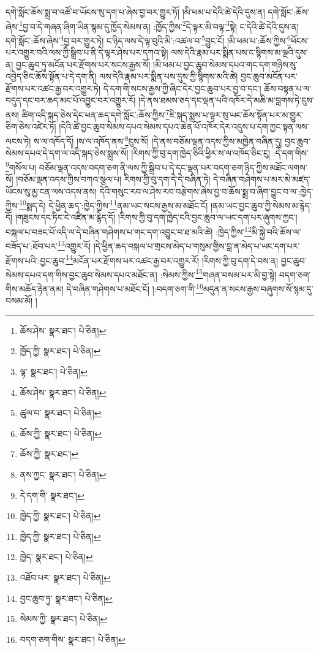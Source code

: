 དགེ་སློང་ཆོས་སྨྲ་བ་འཚོ་བ་ཡོངས་སུ་དག་པ་ཞེས་བྱ་བར་གྱུར་ཏོ། །མི་ཕམ་པ་དེའི་ཚེ་དེའི་དུས་ན། དགེ་སློང་:ཆོས་ཞེས་\footnote{ཆོས་ཤེས་  སྣར་ཐང་།  པེ་ཅིན། }བྱ་བ་དེ་གཞན་ཞིག་ཡིན་སྙམ་དུ་ཁྱོད་སེམས་ན། :ཁྱོད་ཀྱིས་\footnote{ཁྱོད་ཀྱི་  སྣར་ཐང་།  པེ་ཅིན། }དེ་ལྟར་མི་བལྟ་\footnote{ལྟ་  སྣར་ཐང་།  པེ་ཅིན། }སྟེ། ང་དེའི་ཚེ་དེའི་དུས་ན། དགེ་སློང་:ཆོས་ཞེས་\footnote{ཆོས་ཤེས་  སྣར་ཐང་།  པེ་ཅིན། }བྱ་བར་གྱུར་ཏེ། ང་ཉིད་ལས་དེ་ལྟ་བུའི་མི་:འཚལ་བ་\footnote{ཚུལ་བ་  སྣར་ཐང་།  པེ་ཅིན། }བྱུང་ངོ། །མི་ཕམ་པ་:ཆོས་ཀྱིས་\footnote{ཆོས་ཀྱི་  སྣར་ཐང་།  པེ་ཅིན། }ཕོངས་པར་འགྱུར་བའི་ལས་ཀྱི་སྒྲིབ་པ་ནི་དེ་ལྟར་ཤེས་པར་དཀའ་སྟེ། ལས་དེའི་རྣམ་པར་སྨིན་པས་ང་སྙིགས་མ་ལྔའི་དུས་ན། བྱང་ཆུབ་ཏུ་མངོན་པར་རྫོགས་པར་སངས་རྒྱས་སོ། །མི་ཕམ་པ་བྱང་ཆུབ་སེམས་དཔའ་གང་དག་གཉིས་སུ་འབྱེད་ཅིང་ཆོས་སྟོན་པ་དེ་དག་ནི། ལས་དེའི་རྣམ་པར་སྨིན་པས་དུས་ཀྱི་སྙིགས་མའི་ཚེ། བྱང་ཆུབ་མངོན་པར་རྫོགས་པར་འཚང་རྒྱ་བར་འགྱུར་ཏེ། དེ་དག་གི་སངས་རྒྱས་ཀྱི་ཞིང་དེར་བྱང་ཆུབ་པར་བྱ་བ་དང་། ཆོས་བསྟན་པ་ལ་བདུད་དང་བར་ཆད་མང་པོ་འབྱུང་བར་འགྱུར་རོ། །དེ་ནས་ཐམས་ཅད་དང་ལྡན་པའི་འཁོར་དེ་མཆི་མ་བླགས་ཏེ་ངུས་ནས། ཚིག་འདི་སྐད་ཅེས་དེང་ཕན་ཆད་དགེ་སློང་:ཆོས་ཀྱིས་\footnote{ཆོས་ཀྱི་  སྣར་ཐང་། }ཇི་སྐད་སྨྲས་པ་ལྟར་སུ་ཡང་ཆོས་སྟོན་པར་མ་གྱུར་ཅིག་ཅེས་འཛེར་ཏོ། །དེའི་ཚེ་བྱང་ཆུབ་སེམས་དཔའ་སེམས་དཔའ་ཆེན་པོ་འཁོར་དེར་འདུས་པ་དག་ཀྱང་སྟན་ལས་ལངས་ཏེ། ས་ལ་འཁོད་དོ། །ས་ལ་འཁོད་ནས་\footnote{ནས་ཀྱང་  སྣར་ཐང་།  པེ་ཅིན། }ངུས་སོ། །དེ་ནས་བཅོམ་ལྡན་འདས་ཀྱིས་མཁྱེན་བཞིན་དུ། བྱང་ཆུབ་སེམས་དཔའ་དེ་དག་ལ་འདི་སྐད་ཅེས་སྨྲས་སོ། །རིགས་ཀྱི་བུ་དག་ཁྱེད་ཅིའི་ཕྱིར་ས་ལ་འཁོད་ཅིང་ངུ། :དེ་དག་གིས་\footnote{དེ་དག་གི་  སྣར་ཐང་། }གསོལ་པ། བཅོམ་ལྡན་འདས་བདག་ཅག་ནི་ལས་ཀྱི་སྒྲིབ་པ་དེ་དང་ལྡན་པར་བདག་ཅག་ཉིད་ཀྱིས་མཐོང་ལགས་སོ། །བཅོམ་ལྡན་འདས་ཀྱིས་བཀའ་སྩལ་པ། རིགས་ཀྱི་བུ་དག་དེ་དེ་བཞིན་ཏེ། དེ་བཞིན་གཤེགས་པ་མར་མེ་མཛད་ཡོངས་སུ་མྱ་ངན་ལས་འདས་ནས། དེའི་གསུང་རབ་ལ་ཤེས་རབ་བརྩེགས་ཞེས་བྱ་བ་ཆོས་སྨྲ་བ་ཞིག་བྱུང་བ་ལ་:ཁྱེད་ཀྱིས་\footnote{ཁྱེད་ཀྱི་  སྣར་ཐང་།  པེ་ཅིན། }སྨད་དེ། དེ་ཕྱིན་ཆད་:ཁྱེད་ཀྱིས་\footnote{ཁྱེད་ཀྱི་  སྣར་ཐང་།  པེ་ཅིན། }ནམ་ཡང་སངས་རྒྱས་མ་མཐོང་ངོ། །ནམ་ཡང་བྱང་ཆུབ་ཀྱི་སེམས་མ་རྙེད་དོ། །གཟུངས་དང་ཏིང་ངེ་འཛིན་མ་རྙེད་དོ། །རིགས་ཀྱི་བུ་དག་ཁྱེད་ངའི་བྱང་ཆུབ་ལ་ཡང་དག་པར་ཞུགས་ཀྱང་། བསྐལ་པ་བཟང་པོ་འདི་ལ་དེ་བཞིན་གཤེགས་པ་གང་དག་འབྱུང་བ་ཐ་མའི་ཚེ། :ཁྱེད་ཀྱིས་\footnote{ཁྱེད་  སྣར་ཐང་།  པེ་ཅིན། }མི་སྐྱེ་བའི་ཆོས་ལ་བཟོད་པ་:ཐོབ་པར་\footnote{འཐོབ་པར་  སྣར་ཐང་།  པེ་ཅིན། }འགྱུར་རོ། །དེ་ཕྱིན་ཆད་བསྐལ་པ་གྲངས་མེད་པ་གསུམ་གྱིས་བླ་ན་མེད་པ་ཡང་དག་པར་རྫོགས་པའི་:བྱང་ཆུབ་\footnote{བྱང་ཆུབ་ཏུ་  སྣར་ཐང་།  པེ་ཅིན། }མངོན་པར་རྫོགས་པར་འཚང་རྒྱ་བར་འགྱུར་རོ། །རིགས་ཀྱི་བུ་དག་དེ་བས་ན། བྱང་ཆུབ་སེམས་དཔའ་དག་གིས་བྱང་ཆུབ་སེམས་དཔའ་མཐོང་ན། :སེམས་ཀྱིས་\footnote{སེམས་ཀྱི་  སྣར་ཐང་།  པེ་ཅིན། }གཞན་བསམ་པར་མི་བྱ་སྟེ། བདག་ཅག་གིས་མཆོད་རྟེན་ནམ། དེ་བཞིན་གཤེགས་པ་མཐོང་ངོ། །:བདག་ཅག་གི་\footnote{བདག་ཅག་གིས་  སྣར་ཐང་།  པེ་ཅིན། }མདུན་ན་སངས་རྒྱས་བཞུགས་སོ་སྙམ་དུ་བསམ་མོ། །
